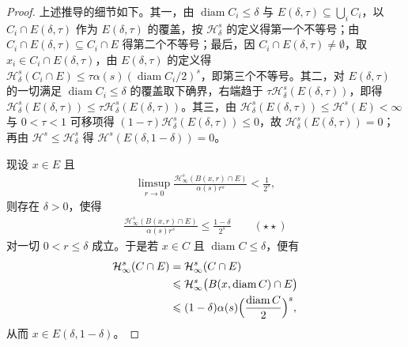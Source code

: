 \documentclass[../../main.tex]{subfiles}%
\begin{document}
\begin{proof}
上述推导的细节如下。其一，由 $\operatorname{diam}C_i\leqslant\delta$ 与 $E(\delta,\tau)\subseteq\bigcup_iC_i$，以 $C_i\cap E(\delta,\tau)$ 作为 $E(\delta,\tau)$ 的覆盖，按 $\mathcal{H}^s_\delta$ 的定义得第一个不等号；由 $C_i\cap E(\delta,\tau)\subseteq C_i\cap E$ 得第二个不等号；最后，因 $C_i\cap E(\delta,\tau)\neq\emptyset$，取 $x_i\in C_i\cap E(\delta,\tau)$，由 $E(\delta,\tau)$ 的定义得 $\mathcal{H}^s_\delta(C_i\cap E)\leqslant\tau\alpha(s)(\operatorname{diam}C_i/2)^s$，即第三个不等号。其二，对 $E(\delta,\tau)$ 的一切满足 $\operatorname{diam}C_i\leqslant\delta$ 的覆盖取下确界，右端趋于 $\tau\mathcal{H}^s_\delta(E(\delta,\tau))$，即得 $\mathcal{H}^s_\delta(E(\delta,\tau))\leqslant\tau\mathcal{H}^s_\delta(E(\delta,\tau))$。其三，由 $\mathcal{H}^s_\delta(E(\delta,\tau))\leqslant\mathcal{H}^s(E)<\infty$ 与 $0<\tau<1$ 可移项得 $(1-\tau)\mathcal{H}^s_\delta(E(\delta,\tau))\leqslant0$，故 $\mathcal{H}^s_\delta(E(\delta,\tau))=0$；再由 $\mathcal{H}^s\leqslant\mathcal{H}^s_\delta$ 得 $\mathcal{H}^s(E(\delta,1-\delta))=0$。

现设 $x\in E$ 且
\begin{align*}
\limsup_{r\to0}\frac{\mathcal{H}^s_\infty(B(x,r)\cap E)}{\alpha(s)r^s}<\frac{1}{2^s},
\end{align*}
则存在 $\delta>0$，使得
\begin{align*}
\frac{\mathcal{H}^s_\infty(B(x,r)\cap E)}{\alpha(s)r^s}\leqslant\frac{1-\delta}{2^s} \qquad(\star\star)
\end{align*}
对一切 $0<r\leqslant\delta$ 成立。于是若 $x\in C$ 且 $\operatorname{diam}C\leqslant\delta$，便有
\begin{align*}
\mathcal{H}^s_\infty(C\cap E)&=\mathcal{H}^s_\infty(C\cap E)\\
&\leqslant\mathcal{H}^s_\infty\bigl(B(x,\operatorname{diam}C)\cap E\bigr)\\
&\leqslant(1-\delta)\alpha(s)\Bigl(\frac{\operatorname{diam}C}{2}\Bigr)^s ,
\end{align*}
从而 $x\in E(\delta,1-\delta)$。


\end{proof}
\end{document}
